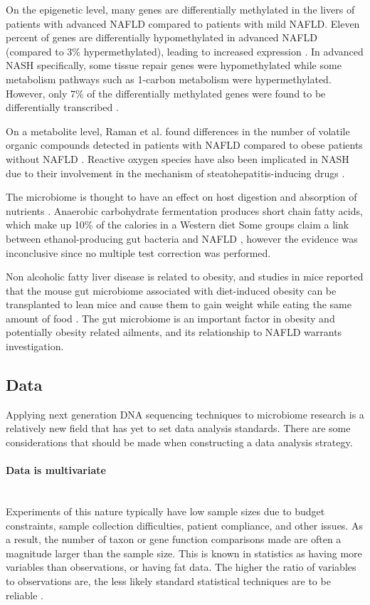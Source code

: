 On the epigenetic level, many genes are differentially methylated in the livers of patients with advanced NAFLD compared to patients with mild NAFLD. Eleven percent of genes are differentially hypomethylated in advanced NAFLD (compared to 3\% hypermethylated), leading to increased expression \cite{murphy2013relationship}. In advanced NASH specifically, some tissue repair genes were hypomethylated while some metabolism pathways such as 1-carbon metabolism were hypermethylated. However, only 7\% of the differentially methylated genes were found to be differentially transcribed \cite{murphy2013relationship}.

On a metabolite level, Raman et al. found differences in the number of volatile organic compounds detected in patients with NAFLD compared to obese patients without NAFLD \cite{raman2013fecal}. Reactive oxygen species have also been implicated in NASH due to their involvement in the mechanism of steatohepatitis-inducing drugs \cite{berson1998steatohepatitis}.

The microbiome is thought to have an effect on host digestion and absorption of nutrients \cite{gill2006metagenomic}. Anaerobic carbohydrate fermentation produces short chain fatty acids, which make up 10\% of the calories in a Western diet \cite{mcneil1984contribution} Some groups claim a link between ethanol-producing gut bacteria and NAFLD \cite{zhu2013characterization} \cite{jiang2015dysbiosis}, however the evidence was inconclusive since no multiple test correction was performed.

Non alcoholic fatty liver disease is related to obesity, and studies in mice reported that the mouse gut microbiome associated with diet-induced obesity can be transplanted to lean mice and cause them to gain weight while eating the same amount of food \cite{turnbaugh2008diet}. The gut microbiome is an important factor in obesity and potentially obesity related ailments, and its relationship to NAFLD warrants investigation.

\subsection{Data}
Applying next generation DNA sequencing techniques to microbiome research is a relatively new field that has yet to set data analysis standards. There are some considerations that should be made when constructing a data analysis strategy.

\paragraph{Data is multivariate}\mbox{}\\
Experiments of this nature typically have low sample sizes due to budget constraints, sample collection difficulties, patient compliance, and other issues. As a result, the number of taxon or gene function comparisons made are often a magnitude larger than the sample size. This is known in statistics as having more variables than observations, or having fat data. The higher the ratio of variables to observations are, the less likely standard statistical techniques are to be reliable \cite{osborne2004sample}.

